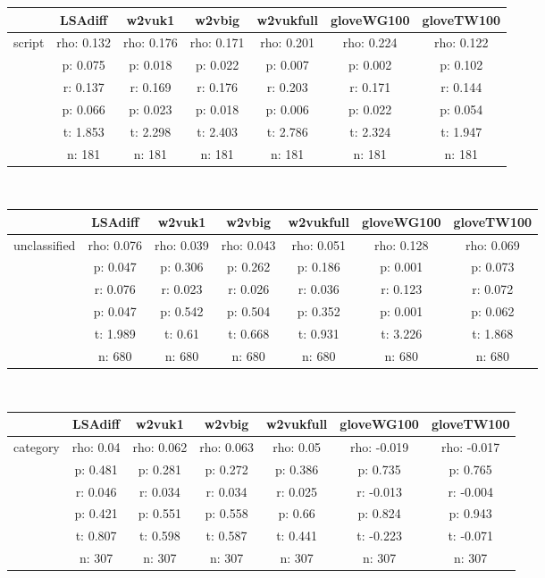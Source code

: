 \documentclass{article}
\begin{document}
\begin{tabular}{ccccccc|}\cline{2-7}
&\multicolumn{1}{|c}{LSAdiff} & w2vuk1 & w2vbig & w2vukfull & gloveWG100 & gloveTW100 \\\hline
\multicolumn{1}{|c|}{\multirow{6}{*}{script}} & rho: 0.132 & rho: 0.176 & rho: 0.171 & rho: 0.201 & rho: 0.224 & rho: 0.122 \\
\multicolumn{1}{|c|}{} & p: 0.075 & p: 0.018 & p: 0.022 & p: 0.007 & p: 0.002 & p: 0.102 \\
\multicolumn{1}{|c|}{} & r: 0.137 & r: 0.169 & r: 0.176 & r: 0.203 & r: 0.171 & r: 0.144 \\
\multicolumn{1}{|c|}{} & p: 0.066 & p: 0.023 & p: 0.018 & p: 0.006 & p: 0.022 & p: 0.054 \\
\multicolumn{1}{|c|}{} & t: 1.853 & t: 2.298 & t: 2.403 & t: 2.786 & t: 2.324 & t: 1.947 \\
\multicolumn{1}{|c|}{} & n: 181 & n: 181 & n: 181 & n: 181 & n: 181 & n: 181 \\
\hline
\end{tabular}\\
\begin{tabular}{ccccccc|}\cline{2-7}
&\multicolumn{1}{|c}{LSAdiff} & w2vuk1 & w2vbig & w2vukfull & gloveWG100 & gloveTW100 \\\hline
\multicolumn{1}{|c|}{\multirow{6}{*}{unclassified}} & rho: 0.076 & rho: 0.039 & rho: 0.043 & rho: 0.051 & rho: 0.128 & rho: 0.069 \\
\multicolumn{1}{|c|}{} & p: 0.047 & p: 0.306 & p: 0.262 & p: 0.186 & p: 0.001 & p: 0.073 \\
\multicolumn{1}{|c|}{} & r: 0.076 & r: 0.023 & r: 0.026 & r: 0.036 & r: 0.123 & r: 0.072 \\
\multicolumn{1}{|c|}{} & p: 0.047 & p: 0.542 & p: 0.504 & p: 0.352 & p: 0.001 & p: 0.062 \\
\multicolumn{1}{|c|}{} & t: 1.989 & t: 0.61 & t: 0.668 & t: 0.931 & t: 3.226 & t: 1.868 \\
\multicolumn{1}{|c|}{} & n: 680 & n: 680 & n: 680 & n: 680 & n: 680 & n: 680 \\
\hline
\end{tabular}\\
\begin{tabular}{ccccccc|}\cline{2-7}
&\multicolumn{1}{|c}{LSAdiff} & w2vuk1 & w2vbig & w2vukfull & gloveWG100 & gloveTW100 \\\hline
\multicolumn{1}{|c|}{\multirow{6}{*}{category}} & rho: 0.04 & rho: 0.062 & rho: 0.063 & rho: 0.05 & rho: -0.019 & rho: -0.017 \\
\multicolumn{1}{|c|}{} & p: 0.481 & p: 0.281 & p: 0.272 & p: 0.386 & p: 0.735 & p: 0.765 \\
\multicolumn{1}{|c|}{} & r: 0.046 & r: 0.034 & r: 0.034 & r: 0.025 & r: -0.013 & r: -0.004 \\
\multicolumn{1}{|c|}{} & p: 0.421 & p: 0.551 & p: 0.558 & p: 0.66 & p: 0.824 & p: 0.943 \\
\multicolumn{1}{|c|}{} & t: 0.807 & t: 0.598 & t: 0.587 & t: 0.441 & t: -0.223 & t: -0.071 \\
\multicolumn{1}{|c|}{} & n: 307 & n: 307 & n: 307 & n: 307 & n: 307 & n: 307 \\
\hline
\end{tabular}\\
\end{document}
